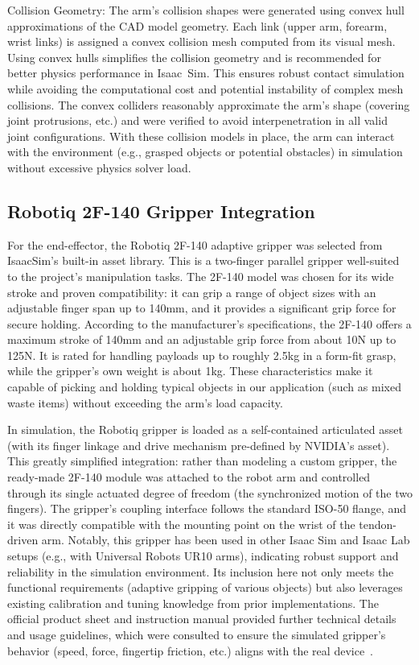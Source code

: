 Collision Geometry: The arm's collision shapes were generated using convex hull approximations of the \ac{CAD} model geometry. Each link (upper arm, forearm, wrist links) is assigned a convex collision mesh computed from its visual mesh. Using convex hulls simplifies the collision geometry and is recommended for better physics performance in Isaac~Sim. This ensures robust contact simulation while avoiding the computational cost and potential instability of complex mesh collisions. The convex colliders reasonably approximate the arm's shape (covering joint protrusions, etc.) and were verified to avoid interpenetration in all valid joint configurations. With these collision models in place, the arm can interact with the environment (e.g., grasped objects or potential obstacles) in simulation without excessive physics solver load.

\subsection{Robotiq 2F-140 Gripper Integration}\label{subsec:gripper}

For the end-effector, the Robotiq 2F-140 adaptive gripper was selected from IsaacSim's built-in asset library. This is a two-finger parallel gripper well-suited to the project's manipulation tasks. The 2F-140 model was chosen for its wide stroke and proven compatibility: it can grip a range of object sizes with an adjustable finger span up to 140mm, and it provides a significant grip force for secure holding. According to the manufacturer's specifications, the 2F-140 offers a maximum stroke of 140mm and an adjustable grip force from about 10N up to 125N\cite{Robotiq2F140Datasheet}. It is rated for handling payloads up to roughly 2.5kg in a form-fit grasp, while the gripper's own weight is about 1kg. These characteristics make it capable of picking and holding typical objects in our application (such as mixed waste items) without exceeding the arm's load capacity.

In simulation, the Robotiq gripper is loaded as a self-contained articulated asset (with its finger linkage and drive mechanism pre-defined by NVIDIA's asset). This greatly simplified integration: rather than modeling a custom gripper, the ready-made 2F-140 module was attached to the robot arm and controlled through its single actuated degree of freedom (the synchronized motion of the two fingers). The gripper's coupling interface follows the standard ISO-50 flange, and it was directly compatible with the mounting point on the wrist of the tendon-driven arm. Notably, this gripper has been used in other Isaac Sim and Isaac Lab setups (e.g., with Universal Robots UR10 arms), indicating robust support and reliability in the simulation environment. Its inclusion here not only meets the functional requirements (adaptive gripping of various objects) but also leverages existing calibration and tuning knowledge from prior implementations. The official product sheet and instruction manual provided further technical details and usage guidelines, which were consulted to ensure the simulated gripper's behavior (speed, force, fingertip friction, etc.) aligns with the real device~\cite{Robotiq2F140Datasheet}.

